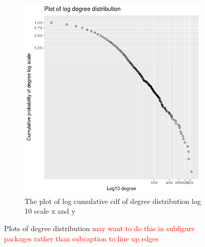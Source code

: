 \begin{figure}
\begin{subfigure}[t]{0.45\textwidth}
        \includegraphics[width=\linewidth]{images/plot_log_degree_distribution.png} 
        \caption{The plot of log cumulative cdf of degree distribution log 10 scale x and y} \label{fig:log_degree_distribution}
    \end{subfigure}
    \caption{Plots of degree distribution \textcolor{red}{may want to do this in subfigure packages rather than subcaption to line up edges}}
\end{figure}

